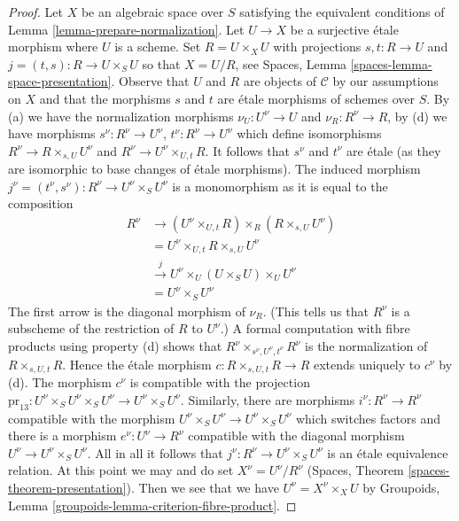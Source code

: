 \documentclass{stacks-project}
\theoremstyle{plain}
\theoremstyle{definition}
\theoremstyle{remark}
\numberwithin{equation}{subsection}
\begin{document}
\begin{proof}
\medskip\noindent
Let $X$ be an algebraic space over $S$ satisfying
the equivalent conditions of Lemma \ref{lemma-prepare-normalization}.
Let $U \to X$ be a surjective \'etale morphism where $U$ is a scheme.
Set $R = U \times_X U$ with projections $s, t : R \to U$ and
$j = (t, s) : R \to U \times_S U$ so that $X = U/R$, see
Spaces, Lemma \ref{spaces-lemma-space-presentation}.
Observe that $U$ and $R$ are objects of $\mathcal{C}$
by our assumptions on $X$ and that the morphisms
$s$ and $t$ are \'etale morphisms of schemes over $S$.
By (a) we have the normalization morphisms
$\nu_U : U^\nu \to U$ and $\nu_R : R^\nu \to R$,
by (d) we have morphisms $s^\nu : R^\nu \to U^\nu$,
$t^\nu : R^\nu \to U^\nu$ which define
isomorphisms $R^\nu \to R \times_{s, U} U^\nu$ and
$R^\nu \to U^\nu \times_{U, t} R$. It follows that
$s^\nu$ and $t^\nu$ are \'etale (as they are isomorphic
to base changes of \'etale morphisms). The induced morphism
$j^\nu = (t^\nu, s^\nu) : R^\nu \to U^\nu \times_S U^\nu$
is a monomorphism as it is equal to the composition
\begin{align*}
R^\nu
& \to
(U^\nu \times_{U, t} R) \times_R (R \times_{s, U} U^\nu) \\
& =
U^\nu \times_{U, t} R \times_{s, U} U^\nu \\
& \xrightarrow{j}
U^\nu \times_U (U \times_S U) \times_U U^\nu \\
& =
U^\nu \times_S U^\nu
\end{align*}
The first arrow is the diagonal morphism of $\nu_R$.
(This tells us that $R^\nu$ is a subscheme of the restriction of
$R$ to $U^\nu$.) A formal computation with fibre products
using property (d) shows that
$R^\nu \times_{s^\nu, U^\nu, t^\nu} R^\nu$ is the normalization
of $R \times_{s, U, t} R$. Hence the \'etale morphism
$c : R \times_{s, U, t} R \to R$ extends uniquely to $c^\nu$ by (d).
The morphism $c^\nu$ is compatible with the projection
$\text{pr}_{13} : U^\nu \times_S U^\nu \times_S U^\nu \to U^\nu \times_S U^\nu$.
Similarly, there are morphisms $i^\nu : R^\nu \to R^\nu$
compatible with the morphism $U^\nu \times_S U^\nu \to U^\nu \times_S U^\nu$
which switches factors and there is a morphism $e^\nu : U^\nu \to R^\nu$
compatible with the diagonal morphism $U^\nu \to U^\nu \times_S U^\nu$.
All in all it follows that $j^\nu : R^\nu \to U^\nu \times_S U^\nu$
is an \'etale equivalence relation.
At this point we may and do set $X^\nu = U^\nu/R^\nu$
(Spaces, Theorem \ref{spaces-theorem-presentation}).
Then we see that we have $U^\nu = X^\nu \times_X U$ by
Groupoids, Lemma \ref{groupoids-lemma-criterion-fibre-product}.


\end{proof}
\end{document}
